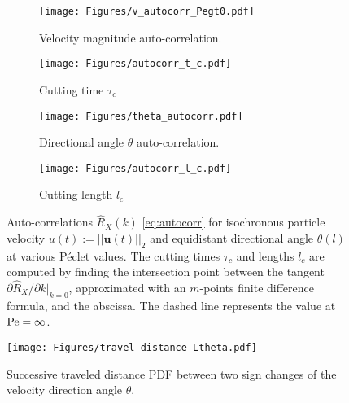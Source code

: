 \begin{figure}[t]
	\centering
	\begin{subfigure}[b]{0.49\textwidth}
		\centering
		\texttt{[image: Figures/v\_autocorr\_Pegt0.pdf]}
		\caption{Velocity magnitude auto-correlation.}
		\label{fig:autocorrv}
	\end{subfigure}
	\hfill
	\begin{subfigure}[b]{0.49\textwidth}
		\centering
		\texttt{[image: Figures/autocorr\_t\_c.pdf]}
		\caption{Cutting time $\tau_c$}
		\label{fig:autocorr_t_c}
	\end{subfigure}
	\begin{subfigure}[b]{0.49\textwidth}
		\centering
		\texttt{[image: Figures/theta\_autocorr.pdf]}
		\caption{Directional angle $\theta$ auto-correlation.}
		\label{fig:autocorrt}
	\end{subfigure}
	\hfill
	\begin{subfigure}[b]{0.49\textwidth}
		\centering
		\texttt{[image: Figures/autocorr\_l\_c.pdf]}
		\caption{Cutting length $l_c$}
		\label{fig:autocorr_l_c}
	\end{subfigure}
	\caption{Auto-correlations $\hat{R}_X(k)$ \eqref{eq:autocorr} for isochronous particle velocity $u(t):=||\textbf{u}(t)||_2$ and equidistant directional angle $\theta(l)$ at various Péclet values. The cutting times $\tau_c$ and lengths $l_c$ are computed by finding the intersection point between the tangent $\partial\hat{R}_X/\partial k|_{k=0}$, approximated with an $m$-points finite difference formula, and the abscissa. The dashed line represents the value at $\mathrm{Pe}=\infty$.}
	\label{fig:autocorr}
\end{figure}
\begin{figure}[h]
	\centering
	\texttt{[image: Figures/travel\_distance\_Ltheta.pdf]}
	\caption{Successive traveled distance PDF between two sign changes of the velocity direction angle $\theta$.}
	\label{fig:ltheta}
\end{figure}


